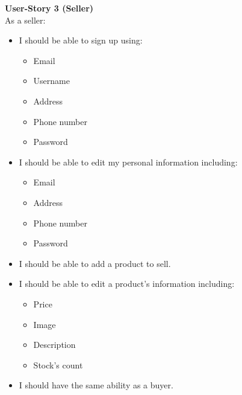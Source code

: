 \documentclass[11pt]{article}
\begin{document}
\textbf{User-Story 3 (Seller)} \\
As a seller:
\begin{itemize}
    \item I should be able to sign up using:
        \begin{itemize}
            \item Email
            \item Username
            \item Address
            \item Phone number
            \item Password
        \end{itemize}
    \item I should be able to edit my personal information including:
        \begin{itemize}
            \item Email
            \item Address
            \item Phone number
            \item Password
        \end{itemize}
    \item I should be able to add a product to sell.
    \item I should be able to edit a product's information including:
        \begin{itemize}
            \item Price
            \item Image
            \item Description
            \item Stock's count
        \end{itemize}
    \item I should have the same ability as a buyer.
\end{itemize}

\clearpage
\end{document}
